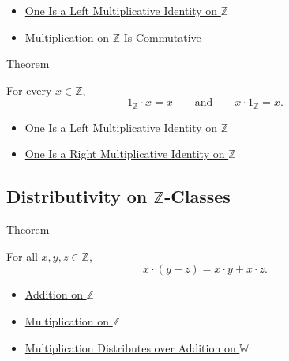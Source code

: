 \begin{dependencies}
\begin{itemize}
  \item \hyperref[thm:one-left-multiplicative-identity-on-z]{One Is a Left Multiplicative Identity on $\mathbb{Z}$}
  \item \hyperref[thm:multiplication-on-z-commutative]{Multiplication on $\mathbb{Z}$ Is Commutative}
\end{itemize}
\end{dependencies}

\begin{theorembox}{Theorem}
\begin{theorem}
\label{thm:one-multiplicative-identity-on-z}
For every $x\in\mathbb{Z}$,
\[
1_{\mathbb{Z}}\cdot x=x
\qquad\text{and}\qquad
x\cdot 1_{\mathbb{Z}}=x.
\]
\end{theorem}
\end{theorembox}

\begin{dependencies}
\begin{itemize}
  \item \hyperref[thm:one-left-multiplicative-identity-on-z]{One Is a Left Multiplicative Identity on $\mathbb{Z}$}
  \item \hyperref[cor:one-right-multiplicative-identity-on-z]{One Is a Right Multiplicative Identity on $\mathbb{Z}$}
\end{itemize}
\end{dependencies}

\subsection*{Distributivity on $\mathbb{Z}$-Classes}

\begin{theorembox}{Theorem}
\begin{theorem}
\label{thm:left-distributivity-on-z}
For all $x,y,z\in\mathbb{Z}$,
\[
x\cdot(y+z)=x\cdot y+x\cdot z.
\]
\end{theorem}
\end{theorembox}

\begin{dependencies}
\begin{itemize}
  \item \hyperref[def:addition-on-z-classes]{Addition on $\mathbb{Z}$}
  \item \hyperref[def:multiplication-on-z-classes]{Multiplication on $\mathbb{Z}$}
  \item \hyperref[thm:multiplication-distributes-over-addition-on-w]{Multiplication Distributes over Addition on $\mathbb{W}$}
\end{itemize}
\end{dependencies}

